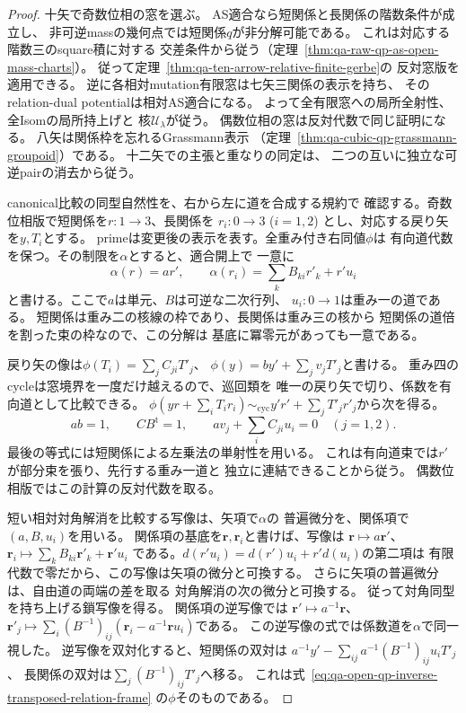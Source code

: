 \begin{proof}
十矢で奇数位相の窓を選ぶ。
AS適合なら短関係と長関係の階数条件が成立し、
非可逆massの幾何点では短関係$q$が非分解可能である。
これは対応する階数三のsquare積に対する
交差条件から従う（定理~\ref{thm:qa-raw-qp-as-open-mass-charts}）。
従って定理~\ref{thm:qa-ten-arrow-relative-finite-gerbe}の
反対窓版を適用できる。
逆に各相対mutation有限窓は七矢三関係の表示を持ち、
そのrelation-dual potentialは相対AS適合になる。
よって全有限窓への局所全射性、全Isomの局所持上げと
核$\mathcal U_\lambda$が従う。
偶数位相の窓は反対代数で同じ証明になる。
八矢は関係枠を忘れるGrassmann表示
（定理~\ref{thm:qa-cubic-qp-grassmann-groupoid}）である。
十二矢での主張と重なりの同定は、
二つの互いに独立な可逆pairの消去から従う。

canonical比較の同型自然性を、右から左に道を合成する規約で
確認する。奇数位相版で短関係を$r:1\to3$、長関係を
$r_i:0\to3$ ($i=1,2$) とし、対応する戻り矢を$y,T_i$とする。
primeは変更後の表示を表す。全重み付き右同値$\phi$は
有向道代数を保つ。その制限を$\alpha$とすると、適合開上で
一意に
\[
 \alpha(r)=a r',\qquad
 \alpha(r_i)=\sum_k B_{ki}r'_k+r'u_i
\]
と書ける。ここで$a$は単元、$B$は可逆な二次行列、
$u_i:0\to1$は重み一の道である。
短関係は重み二の核線の枠であり、長関係は重み三の核から
短関係の道倍を割った束の枠なので、この分解は
基底に冪零元があっても一意である。

戻り矢の像は$\phi(T_i)=\sum_j C_{ji}T'_j$、
$\phi(y)=b y'+\sum_j v_jT'_j$と書ける。
重み四のcycleは窓境界を一度だけ越えるので、巡回類を
唯一の戻り矢で切り、係数を有向道として比較できる。
$\phi(yr+\sum_i T_i r_i)\sim_{\mathrm{cyc}}
 y'r'+\sum_j T'_j r'_j$から次を得る。
\begin{equation}
 ab=1,\qquad CB^{\mathrm{t}}=1,\qquad
 av_j+\sum_i C_{ji}u_i=0 \quad(j=1,2).
\label{eq:qa-open-qp-inverse-transposed-relation-frame}
\end{equation}
最後の等式には短関係による左乗法の単射性を用いる。
これは有向道束では$r'$が部分束を張り、先行する重み一道と
独立に連結できることから従う。
偶数位相版ではこの計算の反対代数を取る。

短い相対対角解消を比較する写像は、矢項で$\alpha$の
普遍微分を、関係項で$(a,B,u_i)$を用いる。
関係項の基底を$\mathbf r,\mathbf r_i$と書けば、写像は
$\mathbf r\mapsto a\mathbf r'$、
$\mathbf r_i\mapsto\sum_k B_{ki}\mathbf r'_k+\mathbf r'u_i$
である。$d(r'u_i)=d(r')u_i+r'd(u_i)$の第二項は
有限代数で零だから、この写像は矢項の微分と可換する。
さらに矢項の普遍微分は、自由道の両端の差を取る
対角解消の次の微分と可換する。
従って対角同型を持ち上げる鎖写像を得る。
関係項の逆写像では
$\mathbf r'\mapsto a^{-1}\mathbf r$、
$\mathbf r'_j\mapsto\sum_i (B^{-1})_{ij}
(\mathbf r_i-a^{-1}\mathbf r u_i)$である。
この逆写像の式では係数道を$\alpha$で同一視した。
逆写像を双対化すると、短関係の双対は
$a^{-1}y'-\sum_{ij}a^{-1}(B^{-1})_{ij}u_iT'_j$、
長関係の双対は$\sum_j(B^{-1})_{ij}T'_j$へ移る。
これは式~\eqref{eq:qa-open-qp-inverse-transposed-relation-frame}
の$\phi$そのものである。


\end{proof}
